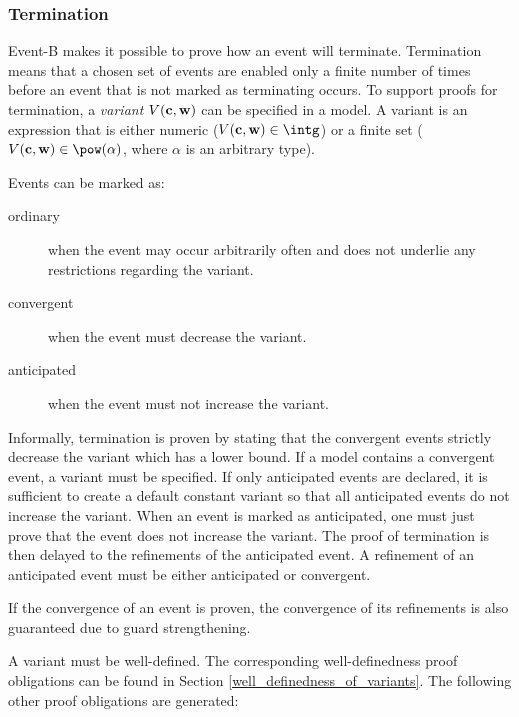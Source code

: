 \subsubsection{Termination}
\label{termination}
Event-B makes it possible to prove how an event will terminate.
Termination means that a chosen set of events are enabled only a finite number
 of times before an event that is not marked as terminating occurs.
To support proofs for termination, a \emph{variant} $V(\mathbf{c},\mathbf{w})$ can be specified in a model.
A variant is an expression that is either numeric 
 ($V(\allconstants,\concvariables)\in\intg$) or
 a finite set ($V(\allconstants,\concvariables)\in\pow(\alpha)$,
 where $\alpha$ is an arbitrary type).

Events can be marked as:
\begin{description}
\item[ordinary] when the event may occur arbitrarily often and does not underlie any restrictions
  regarding the variant.
\item[convergent] when the event must decrease the variant.
\item[anticipated] when the event must not increase the variant.
\end{description}
Informally, termination is proven by stating that the convergent events strictly decrease the variant
  which has a lower bound.
If a model contains a convergent event, a variant must be specified.
If only anticipated events are declared, it is sufficient to create a default constant variant so
  that all anticipated events do not increase the variant.
When an event is marked as anticipated, one must just prove that the event does not increase the
  variant.
The proof of termination is then delayed to the refinements of the anticipated event.
A refinement of an anticipated event must be either anticipated or convergent.

If the convergence of an event is proven, the convergence of its refinements is also guaranteed due to guard strengthening.

A variant must be well-defined. The corresponding well-definedness proof obligations
  can be found in Section \ref{well_definedness_of_variants}.
The following other proof obligations are generated:

